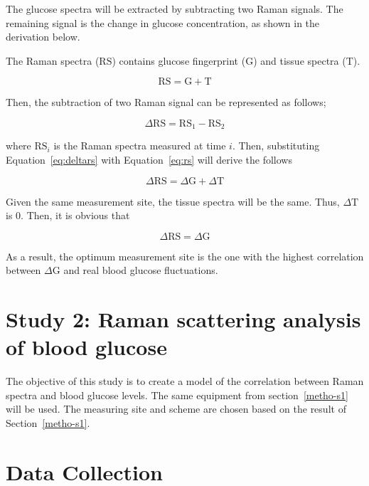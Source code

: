 The glucose spectra will be extracted by subtracting two Raman signals.
The remaining signal is the change in glucose concentration, as shown in the derivation below.

The Raman spectra ($\text{RS}$) contains glucose fingerprint ($\text{G}$) and tissue spectra ($\text{T}$).

\begin{equation}\label{eq:rs}
    \text{RS} = \text{G} + \text{T}
\end{equation}

Then, the subtraction of two Raman signal can be represented as follows;

\begin{equation}\label{eq:deltars}
    \Delta \text{RS} = \text{RS}_1 - \text{RS}_2
\end{equation}

where $\text{RS}_i$ is the Raman spectra measured at time $i$. 
Then, substituting Equation~\ref{eq:deltars} with Equation~\ref{eq:rs} will derive the follows

\begin{equation}
    \Delta \text{RS} = \Delta \text{G} + \Delta \text{T}
\end{equation}

Given the same measurement site, the tissue spectra will be the same.
Thus, $\Delta \text{T}$ is $0$.
Then, it is obvious that 

\begin{equation}
    \Delta \text{RS} = \Delta \text{G}
\end{equation}

As a result, the optimum measurement site is the one with the highest correlation between $\Delta \text{G}$  and real blood glucose fluctuations.

\section{Study 2: Raman scattering analysis of blood glucose}\label{metho-s2}

The objective of this study is to create a model of the correlation between Raman spectra and blood glucose levels.
The same equipment from section~\ref{metho-s1} will be used.
The measuring site and scheme are chosen based on the result of Section~\ref{metho-s1}.

\section{Data Collection}

